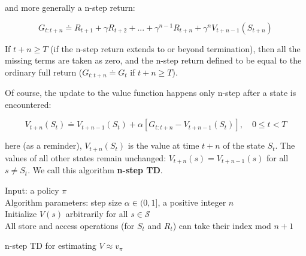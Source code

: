 \documentclass[11pt]{article}
\begin{document}
and more generally a n-step return:

\begin{equation}
G_{t:t+n} \doteq R_{t+1} + \gamma R_{t+2} + {...} + \gamma^{n-1} R_{t+n} + \gamma^n V_{t+n-1}(S_{t+n})
\end{equation}

If \(t+n \geq T\) (if the n-step return extends to or beyond termination), then
all the missing terms are taken as zero, and the n-step return defined to be
equal to the ordinary full return (\(G_{t:t+n} \doteq G_t\) if \(t+n \geq T\)).

Of course, the update to the value function happens only n-step after a state is
encountered:

\begin{equation}
V_{t+n}(S_t) \doteq V_{t+n-1}(S_t) + \alpha [G_{t:t+n} - V_{t+n-1}(S_t)], \quad 0 \leq t < T
\end{equation}

here (as a reminder), \(V_{t+n}(S_t)\) is the value at time \(t+n\) of the state
\(S_t\). The values of all other states remain unchanged: \(V_{t+n}(s) =
V_{t+n-1}(s)\) for all \(s \neq S_t\). We call this algorithm \textbf{n-step TD}.

\begin{algorithm}[H]
Input: a policy $\pi$ \\
Algorithm parameters: step size $\alpha \in (0,1]$, a positive integer $n$ \\
Initialize $V(s)$ arbitrarily for all $s \in \mathcal{S}$ \\
All store and access operations (for $S_t$ and $R_t$) can take their index mod $n+1$ \\

\;
\;
\caption{n-step TD for estimating $V \approx v_\pi$}
\end{algorithm}
\end{document}
